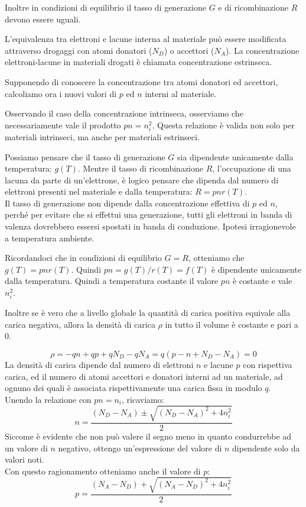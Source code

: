 \documentclass[../template]{subfiles}
\begin{document}
Inoltre in condizioni di equilibrio il tasso di generazione $G$ e di ricombinazione $R$ devono essere uguali.

L'equivalenza tra elettroni e lacune interna al materiale può essere modificata attraverso drogaggi con atomi donatori ($N_D$) o accettori ($N_A$). La concentrazione elettroni-lacune in materiali drogati è chiamata concentrazione estrinseca.

Supponendo di conoscere la concentrazione tra atomi donatori ed accettori, calcoliamo ora i nuovi valori di $p$ ed $n$ interni al materiale.

Osservando il caso della concentrazione intrinseca, osserviamo che necessariamente vale il prodotto $pn = n_i^2$. Questa relazione è valida non solo per materiali intrinseci, ma anche per materiali estrinseci.

Possiamo pensare che il tasso di generazione $G$ sia dipendente unicamente dalla temperatura: $g(T)$. Mentre il tasso di ricombinazione $R$, l'occupazione di una lacuna da parte di un'elettrone, è logico pensare che dipenda dal numero di elettroni presenti nel materiale e dalla temperatura: $R = pnr(T)$.
\\
Il tasso di generazione non dipende dalla concentrazione effettiva di $p$ ed $n$, perché per evitare che si effettui una generazione, tutti gli elettroni in banda di valenza dovrebbero essersi spostati in banda di conduzione. Ipotesi irragionevole a temperatura ambiente.

Ricordandoci che in condizioni di equilibrio $G = R$, otteniamo che $g(T) = pnr(T)$. Quindi $pn = g(T)/r(T) = f(T)$ è dipendente unicamente dalla temperatura. Quindi a temperatura costante il valore $pn$ è costante e vale $n_i^2$.

Inoltre se è vero che a livello globale la quantità di carica positiva equivale alla carica negativa, allora la densità di carica $\rho$ in tutto il volume è costante e pari a $0$.

\[
    \rho = -q n + qp  + qN_D -q N_A = q (p -n + N_D - N_A) = 0
\]
La densità di carica dipende dal numero di elettroni $n$ e lacune $p$ con rispettiva carica, ed il numero di atomi accettori e donatori interni ad un materiale, ad ognuno dei quali è associata rispettivamente una carica fissa in modulo $q$.
\\
Unendo la relazione con $pn = n_i$, ricaviamo:
\[
    n = \frac{(N_D - N_A) \pm \sqrt{(N_D - N_A)^2 + 4 n_i^2}}{2}
\]
Siccome è evidente che non può valere il segno meno in quanto condurrebbe ad un valore di $n$ negativo, ottengo un'espressione del valore di $n$ dipendente solo da valori noti.
\\
Con questo ragionamento otteniamo anche il valore di $p$:
\[
    p = \frac{(N_A - N_D) + \sqrt{(N_A - N_D)^2 + 4 n_i^2}}{2}
\]
\end{document}
